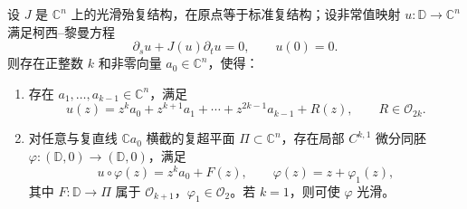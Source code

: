 \begin{proposition}\label{prop:E-5-10}
设 $J$ 是 $\mathbb C^n$ 上的光滑殆复结构，在原点等于标准复结构；设非常值映射 $u:\mathbb D\to\mathbb C^n$ 满足柯西--黎曼方程
\begin{equation}\label{eq:E-5-2}
  \partial_su+J(u)\partial_tu=0,\qquad u(0)=0.
\end{equation}
则存在正整数 $k$ 和非零向量 $a_0\in\mathbb C^n$，使得：
\begin{enumerate}
\item[(i)] 存在 $a_1,\ldots,a_{k-1}\in\mathbb C^n$，满足
\[
  u(z)=z^ka_0+z^{k+1}a_1+\cdots+z^{2k-1}a_{k-1}+R(z),
  \qquad R\in\mathcal O_{2k}.
\]
\item[(ii)] 对任意与复直线 $\mathbb Ca_0$ 横截的复超平面 $\Pi\subset\mathbb C^n$，存在局部 $C^{k,1}$ 微分同胚 $\varphi:(\mathbb D,0)\to(\mathbb D,0)$，满足
\[
  u\circ\varphi(z)=z^ka_0+F(z),\qquad
  \varphi(z)=z+\varphi_1(z),
\]
其中 $F:\mathbb D\to\Pi$ 属于 $\mathcal O_{k+1}$，$\varphi_1\in\mathcal O_2$。若 $k=1$，则可使 $\varphi$ 光滑。
\end{enumerate}
\end{proposition}

